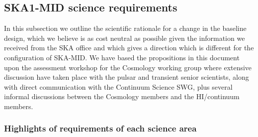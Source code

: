 \documentclass[sfheadings,a4paper,times,9pt,floats,floatfix]{article}
\begin{document}
\subsection{SKA1-MID science requirements}\label{sec:sci-req}

In this subsection we outline the scientific rationale for a change in
the baseline design, which we believe is as cost neutral as possible given the information we received from the
SKA office and which gives a direction which is different for the configuration of SKA-MID.
We have based the propositions in this document upon the assessment workshop for the
Cosmology working group where extensive discussion have taken place with the pulsar and
transient senior scientists, along with direct communication with the
Continuum Science SWG, plus several informal discussions between the Cosmology
members and the HI/continuum members.

\subsubsection{Highlights of requirements of each science area}
\end{document}
